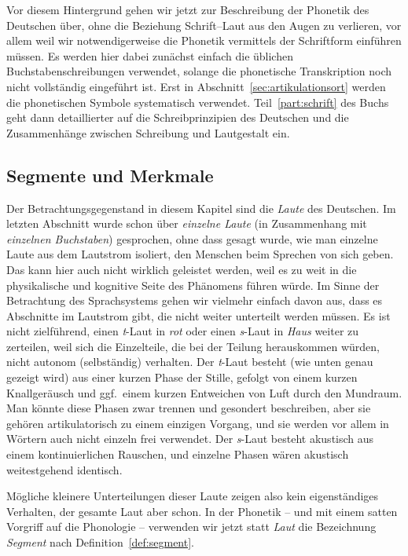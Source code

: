 Vor diesem Hintergrund gehen wir jetzt zur Beschreibung der Phonetik des Deutschen über, ohne die Beziehung Schrift--Laut aus den Augen zu verlieren, vor allem weil wir notwendigerweise die Phonetik vermittels der Schriftform einführen müssen.
Es werden hier dabei zunächst einfach die üblichen Buchstabenschreibungen verwendet, solange die phonetische Transkription noch nicht vollständig eingeführt ist.
Erst in Abschnitt~\ref{sec:artikulationsort} werden die phonetischen Symbole systematisch verwendet.
Teil~\ref{part:schrift} des Buchs geht dann detaillierter auf die Schreibprinzipien des Deutschen und die Zusammenhänge zwischen Schreibung und Lautgestalt ein.

\subsection{Segmente und Merkmale}

\label{sec:segmentemerkmale}

Der Betrachtungsgegenstand in diesem Kapitel sind die \textit{Laute} des Deutschen.
Im letzten Abschnitt wurde schon über \textit{einzelne Laute} (in Zusammenhang mit \textit{einzelnen Buchstaben}) gesprochen, ohne dass gesagt wurde, wie man einzelne Laute aus dem Lautstrom isoliert, den Menschen beim Sprechen von sich geben.
Das kann hier auch nicht wirklich geleistet werden, weil es zu weit in die physikalische und kognitive Seite des Phänomens führen würde.
Im Sinne der Betrachtung des Sprachsystems gehen wir vielmehr einfach davon aus, dass es Abschnitte im Lautstrom gibt, die nicht weiter unterteilt werden müssen.
Es ist \zB nicht zielführend, einen \textit{t}-Laut in \textit{rot} oder einen \textit{s}-Laut in \textit{Haus} weiter zu zerteilen, weil sich die Einzelteile, die bei der Teilung herauskommen würden, nicht autonom (selbständig) verhalten.
Der \textit{t}-Laut besteht (wie unten genau gezeigt wird) aus einer kurzen Phase der Stille, gefolgt von einem kurzen Knallgeräusch und ggf.\ einem kurzen Entweichen von Luft durch den Mundraum.
Man könnte diese Phasen zwar trennen und gesondert beschreiben, aber sie gehören artikulatorisch zu einem einzigen Vorgang, und sie werden vor allem in Wörtern auch nicht einzeln frei verwendet.
Der \textit{s}-Laut besteht akustisch aus einem kontinuierlichen Rauschen, und einzelne Phasen wären akustisch weitestgehend identisch.

Mögliche kleinere Unterteilungen dieser Laute zeigen also kein eigenständiges Verhalten, der gesamte Laut aber schon.
In der Phonetik -- und mit einem satten Vorgriff auf die Phonologie -- verwenden wir jetzt statt \textit{Laut} die Bezeichnung \textit{Segment} nach Definition~\ref{def:segment}.

